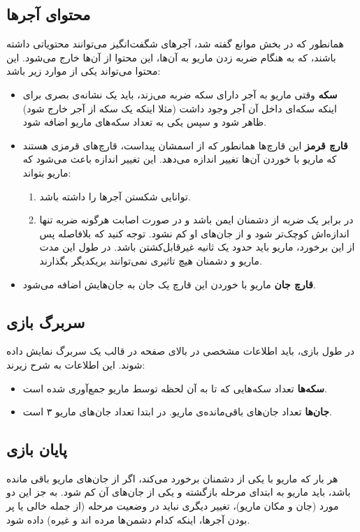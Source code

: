 \documentclass{utap}
\begin{document}
	\subsection{محتوای آجرها}
همانطور که در بخش موانع گفته شد، آجر‌های شگفت‌انگیز می‌توانند محتویاتی داشته باشند، که به هنگام ضربه زدن ماریو به آن‌ها، این محتوا از آن‌ها خارج می‌شود. این محتوا می‌تواند یکی از موارد زیر باشد:
	\begin{itemize}
		\item
\textbf{سکه}
وقتی ماریو به آجر دارای سکه ضربه می‌زند، باید یک نشانه‌ی بصری برای اینکه سکه‌ای داخل آن آجر وجود داشت (مثلا اینکه یک سکه از آجر خارج شود) ظاهر شود و سپس یکی به تعداد سکه‌های ماریو اضافه شود.
		\item
\textbf{قارچ قرمز}
این قارچ‌ها همانطور که از اسمشان پیداست، قارچ‌های قرمزی هستند که ماریو با خوردن آن‌ها تغییر اندازه می‌دهد. این تغییر اندازه باعث می‌شود که ماریو بتواند:
		\begin{enumerate}
			\item
توانایی شکستن آجر‌ها را داشته باشد.
			\item
در برابر یک ضربه از دشمنان ایمن باشد و در صورت اصابت هرگونه ضربه تنها اندازه‌اش کوچک‌تر شود و از جان‌های او کم نشود. توجه کنید که بلافاصله پس از این برخورد، ماریو باید حدود یک ثانیه غیرقابل‌کشتن باشد. در طول این مدت ماریو و دشمنان هیچ تاثیری نمی‌توانند بر‌یکدیگر بگذارند.
		\end{enumerate}

		\item
\textbf{قارچ جان}
ماریو با خوردن این قارچ یک جان به جان‌هایش اضافه می‌شود.

	\end{itemize}

	\subsection{سربرگ‌ بازی}
در طول بازی، باید اطلاعات مشخصی در بالای صفحه در قالب یک سربرگ نمایش داده شوند. این اطلاعات به شرح زیرند:
	\begin{itemize}
		\item
\textbf{سکه‌ها}
تعداد سکه‌هایی که تا به آن لحظه توسط ماریو جمع‌آوری شده است.
		\item
\textbf{جان‌ها}
تعداد جان‌های باقی‌مانده‌ی ماریو. در ابتدا تعداد جان‌های ماریو  ۳ است.
	\end{itemize}

	\subsection{پایان بازی}
هر بار که ماریو با یکی از دشمنان برخورد می‌کند، اگر از جان‌های ماریو باقی مانده باشد، باید ماریو به ابتدای مرحله بازگشته و یکی از جان‌های آن کم شود. به جز این دو مورد (جان و مکان ماریو)، تغییر دیگری نباید در وضعیت مرحله (از جمله خالی یا پر بودن آجر‌ها، اینکه کدام دشمن‌ها مرده اند و غیره) داده شود.
\end{document}
